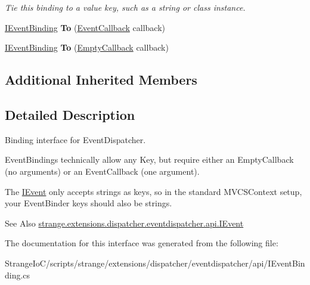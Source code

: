 \begin{DoxyCompactItemize}
\begin{DoxyCompactList}\small\item\em Tie this binding to a value key, such as a string or class instance. \end{DoxyCompactList}\item 
\hypertarget{interfacestrange_1_1extensions_1_1dispatcher_1_1eventdispatcher_1_1api_1_1_i_event_binding_aa3ea162300b1c274476c5f89c3ddbecb}{\hyperlink{interfacestrange_1_1extensions_1_1dispatcher_1_1eventdispatcher_1_1api_1_1_i_event_binding}{I\-Event\-Binding} {\bfseries To} (\hyperlink{namespacestrange_1_1extensions_1_1dispatcher_1_1eventdispatcher_1_1api_a936e11bc9a4f26a96ede9941cc730e72}{Event\-Callback} callback)}\label{interfacestrange_1_1extensions_1_1dispatcher_1_1eventdispatcher_1_1api_1_1_i_event_binding_aa3ea162300b1c274476c5f89c3ddbecb}

\item 
\hypertarget{interfacestrange_1_1extensions_1_1dispatcher_1_1eventdispatcher_1_1api_1_1_i_event_binding_a57463800a377374ccab15f11e0500457}{\hyperlink{interfacestrange_1_1extensions_1_1dispatcher_1_1eventdispatcher_1_1api_1_1_i_event_binding}{I\-Event\-Binding} {\bfseries To} (\hyperlink{namespacestrange_1_1extensions_1_1dispatcher_1_1eventdispatcher_1_1api_a4d68e68b31e6e0f733bd72ddcd6111fa}{Empty\-Callback} callback)}\label{interfacestrange_1_1extensions_1_1dispatcher_1_1eventdispatcher_1_1api_1_1_i_event_binding_a57463800a377374ccab15f11e0500457}

\end{DoxyCompactItemize}
\subsection*{Additional Inherited Members}


\subsection{Detailed Description}
Binding interface for Event\-Dispatcher. 

Event\-Bindings technically allow any Key, but require either an Empty\-Callback (no arguments) or an Event\-Callback (one argument).

The \hyperlink{interfacestrange_1_1extensions_1_1dispatcher_1_1eventdispatcher_1_1api_1_1_i_event}{I\-Event} only accepts strings as keys, so in the standard M\-V\-C\-S\-Context setup, your Event\-Binder keys should also be strings.

\begin{DoxySeeAlso}{See Also}
\hyperlink{interfacestrange_1_1extensions_1_1dispatcher_1_1eventdispatcher_1_1api_1_1_i_event}{strange.\-extensions.\-dispatcher.\-eventdispatcher.\-api.\-I\-Event} 
\end{DoxySeeAlso}


The documentation for this interface was generated from the following file\-:\begin{DoxyCompactItemize}
\item 
Strange\-Io\-C/scripts/strange/extensions/dispatcher/eventdispatcher/api/I\-Event\-Binding.\-cs\end{DoxyCompactItemize}

